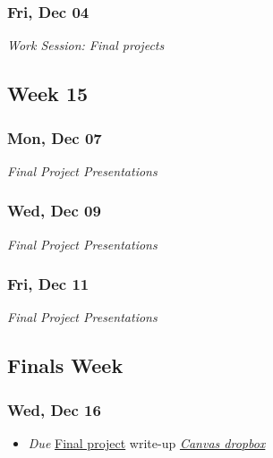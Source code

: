\documentclass[
  letterpaper,
  DIV=11,
  numbers=noendperiod]{scrartcl}
\providecommand{\tightlist}{%
  \setlength{\itemsep}{0pt}\setlength{\parskip}{0pt}}
\begin{document}
\subsubsection*{Fri, Dec 04}\label{fri-dec-04}

\emph{Work Session: Final projects}

\subsection*{Week 15}\label{week-15}

\subsubsection*{Mon, Dec 07}\label{mon-dec-07}

\emph{Final Project Presentations}

\subsubsection*{Wed, Dec 09}\label{wed-dec-09}

\emph{Final Project Presentations}

\subsubsection*{Fri, Dec 11}\label{fri-dec-11}

\emph{Final Project Presentations}

\subsection*{Finals Week}\label{finals-week}

\subsubsection*{Wed, Dec 16}\label{wed-dec-16}

\begin{itemize}
\tightlist
\item
   \emph{Due} \href{exercises/final-project.qmd}{Final
  project} write-up \textbar{} \href{}{ \emph{Canvas
  dropbox}}
\end{itemize}
\end{document}
